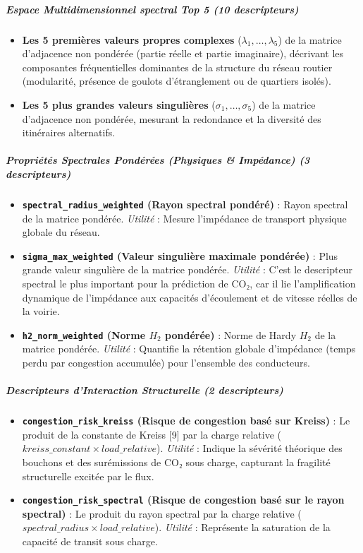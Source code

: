 \documentclass[10pt, a4paper]{article}
\providecommand{\tightlist}{}
\begin{document}
\subparagraph{Espace Multidimensionnel spectral Top 5 (10
descripteurs)}\label{espace-multidimensionnel-spectral-top-5-10-descripteurs}

\begin{itemize}
\tightlist
\item
  \textbf{Les 5 premières valeurs propres complexes}
  (\(\lambda_1, \dots, \lambda_5\)) de la matrice d'adjacence non
  pondérée (partie réelle et partie imaginaire), décrivant les
  composantes fréquentielles dominantes de la structure du réseau
  routier (modularité, présence de goulots d'étranglement ou de
  quartiers isolés).
\item
  \textbf{Les 5 plus grandes valeurs singulières}
  (\(\sigma_1, \dots, \sigma_5\)) de la matrice d'adjacence non
  pondérée, mesurant la redondance et la diversité des itinéraires
  alternatifs.
\end{itemize}

\subparagraph{Propriétés Spectrales Pondérées (Physiques \& Impédance)
(3
descripteurs)}\label{propriuxe9tuxe9s-spectrales-ponduxe9ruxe9es-physiques-impuxe9dance-3-descripteurs}

\begin{itemize}
\tightlist
\item
  \textbf{\texttt{spectral\_radius\_weighted} (Rayon spectral pondéré)}
  : Rayon spectral de la matrice pondérée. \emph{Utilité} : Mesure
  l'impédance de transport physique globale du réseau.
\item
  \textbf{\texttt{sigma\_max\_weighted} (Valeur singulière maximale
  pondérée)} : Plus grande valeur singulière de la matrice pondérée.
  \emph{Utilité} : C'est le descripteur spectral le plus important pour
  la prédiction de CO₂, car il lie l'amplification dynamique de
  l'impédance aux capacités d'écoulement et de vitesse réelles de la
  voirie.
\item
  \textbf{\texttt{h2\_norm\_weighted} (Norme \(H_2\) pondérée)} : Norme
  de Hardy \(H_2\) de la matrice pondérée. \emph{Utilité} : Quantifie la
  rétention globale d'impédance (temps perdu par congestion accumulée)
  pour l'ensemble des conducteurs.
\end{itemize}

\subparagraph{Descripteurs d'Interaction Structurelle (2
descripteurs)}\label{descripteurs-dinteraction-structurelle-2-descripteurs-1}

\begin{itemize}
\tightlist
\item
  \textbf{\texttt{congestion\_risk\_kreiss} (Risque de congestion basé
  sur Kreiss)} : Le produit de la constante de Kreiss {[}9{]} par la
  charge relative (\(kreiss\_constant \times load\_relative\)).
  \emph{Utilité} : Indique la sévérité théorique des bouchons et des
  surémissions de CO₂ sous charge, capturant la fragilité structurelle
  excitée par le flux.
\item
  \textbf{\texttt{congestion\_risk\_spectral} (Risque de congestion basé
  sur le rayon spectral)} : Le produit du rayon spectral par la charge
  relative (\(spectral\_radius \times load\_relative\)). \emph{Utilité}
  : Représente la saturation de la capacité de transit sous charge.
\end{itemize}
\end{document}

